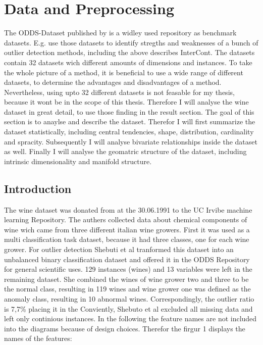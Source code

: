 \section{Data and Preprocessing}
The ODDS-Dataset published by \citet{Rayana:2016} is a widley used repository as benchmark datasets.
E.g. \citet{shenkar2022anomaly} use those datasets to identify stregths and weaknesses of a bunch of outlier detection methods, including the above describes InterCont.
The datasets contain 32 datasets wich different amounts of dimensions and instances. 
To take the whole picture of a method, it is beneficial to use a wide range of different datasets, to determine the advantages and disadvantages of a method.
Nevertheless, using upto 32 different datasets is not feasable for my thesis, because it wont be in the scope of this thesis.
Therefore I will analyse the wine dataset in great detail, to use those finding in the result section.
The goal of this section is to anaylse and describe the dataset.
Therefor I will first summarize the dataset statistically, including central tendencies, shape, distribution, cardinality and spracity.
Subsequently I will analyse bivariate relationships inside the dataset as well.
Finally I will analyse the geomatric structure of the dataset, including intrinsic dimensionality and manifold structure.


\subsection{Introduction}  
The wine dataset was donated from \citet{wine_109} at the 30.06.1991 to the UC Irvibe machine learning Repository.
The authers collected data about chemical components of wine wich came from three different italian wine growers. 
First it was used as a multi classification task dataset, because it had three classes, one for each wine grower.
For outlier detection Shebuti et al tranformed this dataset into an unbalanced binary classification dataset and offered it in the ODDS Repository for general scientific uses. 
129 instances (wines) and 13 variables were left in the remaining dataset.
She combined the wines of wine grower two and three to be the normal class, resulting in 119 wines and wine grower one was defined as the anomaly class, resulting in 10 abnormal wines.
Correspondingly, the outlier ratio is 7,7\% placing it in the 
Conviently, Shebuto et al excluded all missing data and left only continious instances.
In the following the feature names are not included into the diagrams because of design choices.
Therefor the firgur 1 displays the names of the features: 

